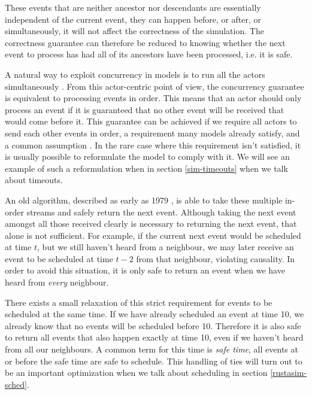 These events that are neither ancestor nor descendants are essentially independent of the current event, they can happen before, or after, or simultaneously, it will not affect the correctness of the simulation.
The correctness guarantee can therefore be reduced to knowing whether the next event to process has had all of its ancestors have been processed, i.e. it is safe.

A natural way to exploit concurrency in models is to run all the actors simultaneously \cite{misra_distributed_1986}.
From this actor-centric point of view, the concurrency guarantee is equivalent to processing events in order.
This means that an actor should only process an event if it is guaranteed that no other event will be received that would come before it.
This guarantee can be achieved if we require all actors to send each other events in order, a requirement many models already satisfy, and a common assumption \cite{fujimoto_parallel_2001}. 
In the rare case where this requirement isn't satisfied, it is usually possible to reformulate the model to comply with it.
We will see an example of such a reformulation when in section \ref{sim-timeouts} when we talk about timeouts.

An old algorithm, described as early as 1979\cite{fujimoto_parallel_2000, misra_distributed_1986}  , is able to take these multiple in-order streams and safely return the next event.
Although taking the next event amongst all those received clearly is necessary to returning the next event, that alone is not sufficient.
For example, if the current next event would be scheduled at time $t$, but we still haven't heard from a neighbour, we may later receive an event to be scheduled at time $t-2$ from that neighbour, violating causality.
In order to avoid this situation, it is only safe to return an event when we have heard from \emph{every} neighbour. 

There exists a small relaxation of this strict requirement for events to be scheduled at the same time.
If we have already scheduled an event at time 10, we already know that no events will be scheduled before 10.
Therefore it is also safe to return all events that also happen exactly at time 10, even if we haven't heard from all our neighbours.
A common term for this time is \emph{safe time}, all events at or before the safe time are safe to schedule.
This handling of ties will turn out to be an important optimization when we talk about scheduling in section \ref{rustasim-sched}.


